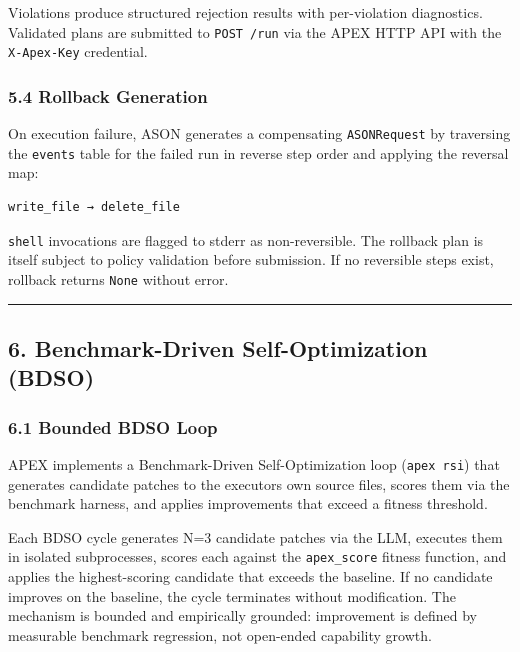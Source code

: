 \documentclass[
]{article}
\begin{document}
Violations produce structured rejection results with per-violation
diagnostics. Validated plans are submitted to \texttt{POST\ /run} via
the APEX HTTP API with the \texttt{X-Apex-Key} credential.

\subsubsection{5.4 Rollback Generation}\label{54-rollback-generation}

On execution failure, ASON generates a compensating \texttt{ASONRequest}
by traversing the \texttt{events} table for the failed run in reverse
step order and applying the reversal map:

\begin{verbatim}
write_file → delete_file
\end{verbatim}

\texttt{shell} invocations are flagged to stderr as non-reversible. The
rollback plan is itself subject to policy validation before submission.
If no reversible steps exist, rollback returns \texttt{None} without
error.

\begin{center}\rule{0.5\linewidth}{0.5pt}\end{center}

\subsection{6. Benchmark-Driven Self-Optimization
(BDSO)}\label{6-benchmark-driven-self-optimization-bdso}

\subsubsection{6.1 Bounded BDSO Loop}\label{61-bounded-bdso-loop}

APEX implements a Benchmark-Driven Self-Optimization loop
(\texttt{apex\ rsi}) that generates candidate patches to the
executor\textquotesingle s own source files, scores them via the
benchmark harness, and applies improvements that exceed a fitness
threshold.

Each BDSO cycle generates N=3 candidate patches via the LLM, executes
them in isolated subprocesses, scores each against the
\texttt{apex\_score} fitness function, and applies the highest-scoring
candidate that exceeds the baseline. If no candidate improves on the
baseline, the cycle terminates without modification. The mechanism is
bounded and empirically grounded: improvement is defined by measurable
benchmark regression, not open-ended capability growth.
\end{document}
